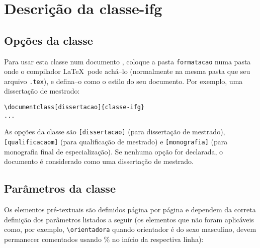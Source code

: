 \chapter{Descrição da \textsf{classe-ifg}}
\label{cap:descr}

\section{Opções da classe}
\label{sec:opcoes}
Para usar esta classe num documento \LaTeXe, coloque a pasta \verb|formatacao| numa pasta onde o compilador \LaTeX\ pode achá--lo (normalmente na mesma pasta que seu arquivo \verb|.tex|), e defina--o como o estilo do seu documento. Por exemplo, uma dissertação de mestrado:
\begin{verbatim}
\documentclass[dissertacao]{classe-ifg}
...

\end{verbatim}

As opções da classe são \verb|[dissertacao]| (para dissertação de mestrado), \verb|[qualificacaom]| (para qualificação de mestrado) e \verb|[monografia]| (para monografia final de especialização). Se nenhuma opção for declarada, o documento é considerado como uma dissertação de mestrado. %


\section{Parâmetros da classe}
\label{sec:param}
Os elementos pré-textuais são definidos página por página e dependem da correta definição dos parâmetros listados a seguir (os elementos que não foram aplicáveis como, por exemplo, \verb|\orientadora| quando orientador é do sexo masculino, devem permanecer comentados usando \% no início da respectiva linha):

